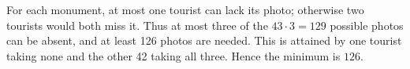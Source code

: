 For each monument, at most one tourist can lack its photo; otherwise two tourists would both miss it. Thus at most three of the $43\cdot3=129$ possible photos can be absent, and at least 126 photos are needed. This is attained by one tourist taking none and the other 42 taking all three. Hence the minimum is $\boxed{126}$.
